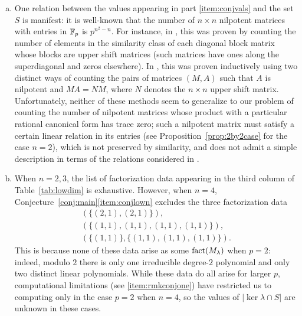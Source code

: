 \begin{rem}
\begin{enumerate}[(a)]
\item One relation between the values appearing in part \eqref{item:conjvals} and the set $S$ is manifest: it is well-known that the number of $n\times n$ nilpotent matrices with entries in $\mathbb{F}_p$ is $p^{n^2-n}$. For instance, in \cite{fine}, this was proven by counting the number of elements in the similarity class of each diagonal block matrix whose blocks are upper shift matrices (such matrices have ones along the superdiagonal and zeros elsewhere). In \cite{gerstenhaber}, this was proven inductively using two distinct ways of counting the pairs of matrices $(M,A)$ such that $A$ is nilpotent and $MA=NM$, where $N$ denotes the $n\times n$ upper shift matrix. Unfortunately, neither of these methods seem to generalize to our problem of counting the number of nilpotent matrices whose product with a particular rational canonical form has trace zero; such a nilpotent matrix must satisfy a certain linear relation in its entries (see Proposition~\ref{prop:2by2case} for the case $n=2$), which is not preserved by similarity, and does not admit a simple description in terms of the relations considered in \cite{gerstenhaber}.\label{item:rmkconjnum}

\item When $n=2,3$, the list of factorization data appearing in the third column of Table~\ref{tab:lowdim} is exhaustive. However, when $n=4$, Conjecture~\ref{conj:main}\eqref{item:conjlown} excludes the three factorization data
\begin{gather*}
(\{(2,1),(2,1)\}),\\
(\{(1,1),(1,1),(1,1),(1,1)\}),\\
(\{(1,1)\},\{(1,1),(1,1),(1,1)\}).
\end{gather*}
This is because none of these data arise as some $\operatorname{fact}(M_\lambda)$ when $p=2$: indeed, modulo $2$ there is only one irreducible degree-$2$ polynomial and only two distinct linear polynomials. While these data do all arise for larger $p$, computational limitations (see \eqref{item:rmkconjone}) have restricted us to computing only in the case $p=2$ when $n=4$, so the values of $|\ker\lambda\cap S|$ are unknown in these cases.\label{item:rmkconjtwo}


\end{enumerate}
\end{rem}
